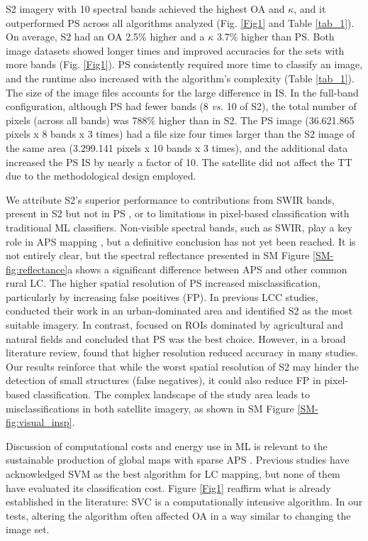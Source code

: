 \documentclass[journal]{IEEEtran}
\begin{document}
S2 imagery with 10 spectral bands achieved the highest OA and $\kappa$, and it outperformed PS across all algorithms analyzed (Fig. \ref{Fig1} and Table \ref{tab_1}). On average, S2 had an OA 2.5\% higher and a $\kappa$ 3.7\% higher than PS. Both image datasets showed longer times and improved accuracies for the sets with more bands (Fig. \ref{Fig1}). PS consistently required more time to classify an image, and the runtime also increased with the algorithm's complexity (Table \ref{tab_1}). The size of the image files accounts for the large difference in IS. In the full-band configuration, although PS had fewer bands (8 \emph{vs.} 10 of S2), the total number of pixels (across all bands) was 788\% higher than in S2. The PS image (36.621.865 pixels x 8 bands x 3 times) had a file size four times larger than the S2 image of the same area (3.299.141 pixels x 10 bands x 3 times), and the additional data increased the PS IS by nearly a factor of 10. The satellite did not affect the TT due to the methodological design employed.

We attribute S2's superior performance to contributions from SWIR bands, present in S2 but not in PS \cite{Despini2025}, or to limitations in pixel-based classification with traditional ML classifiers. Non-visible spectral bands, such as SWIR, play a key role in APS mapping \cite{Zhang2025, Veettil2023}, but a definitive conclusion has not yet been reached. It is not entirely clear, but the spectral reflectance presented in SM Figure \ref{SM-fig:reflectance}a shows a significant difference between APS and other common rural LC. The higher spatial resolution of PS increased misclassification, particularly by increasing false positives (FP). In previous LCC studies, \cite{Rahman2020} conducted their work in an urban-dominated area and identified S2 as the most suitable imagery. In contrast, \cite{Acharki2022, Rao2021, Ye2021} focused on ROIs dominated by agricultural and natural fields and concluded that PS was the best choice. However, in a broad literature review, \cite{Sheykhmousa2020} found that higher resolution reduced accuracy in many studies. Our results reinforce that while the worst spatial resolution of S2 may hinder the detection of small structures (false negatives), it could also reduce FP in pixel-based classification. The complex landscape of the study area leads to misclassifications in both satellite imagery, as shown in SM Figure \ref{SM-fig:visual_insp}.

Discussion of computational costs and energy use in ML \cite{GarciaMartin2019} is relevant to the sustainable production of global maps with sparse APS \cite{Lu2025, Zhang2025}. Previous studies have acknowledged SVM as the best algorithm for LC mapping, but none of them have evaluated its classification cost. Figure \ref{Fig1} reaffirm what is already established in the literature: SVC is a computationally intensive algorithm. In our tests, altering the algorithm often affected OA in a way similar to changing the image set.
\end{document}
